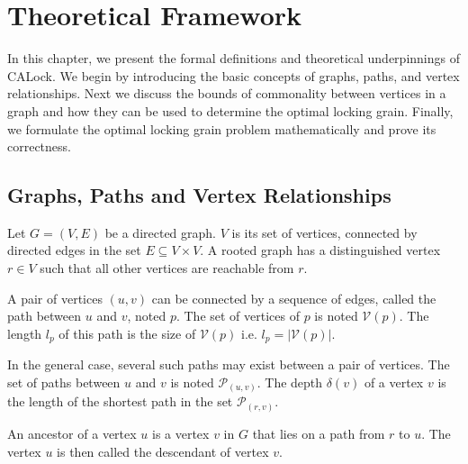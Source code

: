 \chapter{Theoretical Framework} \label{chap:theory}

In this chapter, we present the formal definitions and theoretical underpinnings of CALock.
We begin by introducing the basic concepts of graphs, paths, and vertex relationships.
Next we discuss the bounds of commonality between vertices in a graph and how they can be used to determine the optimal locking grain.
Finally, we formulate the optimal locking grain problem mathematically and prove its correctness.

\section{Graphs, Paths and Vertex Relationships}


Let $G=(V, E)$ be a directed graph. $V$ is its set of vertices, connected by directed edges in the set $E \subseteq V \times V$.  A rooted graph has a distinguished vertex $r \in V$ such that all other vertices are reachable from $r$.

A pair of vertices $(u, v)$ can be connected by a sequence of edges, called the path between $u$ and $v$, noted $p$. The set of vertices of $p$ is noted $\mathcal{V}(p)$. The length $l_p$ of this path is the size of $\mathcal{V}(p)$ i.e. $l_p = \lvert \mathcal{V}(p)\rvert$.




In the general case, several such paths may exist between a pair of vertices.
The set of paths between $u$ and $v$ is noted $\mathcal{P}_{(u,v)}$.
The depth $\delta(v)$ of a vertex $v$ is the length of the shortest path in the set $\mathcal{P}_{(r,v)}$.
\begin{definition}
	An ancestor of a vertex $u$ is a vertex $v$ in $G$ that lies on a path from $r$ to $u.$ The vertex $u$ is then called the descendant of vertex $v$.
\end{definition}

